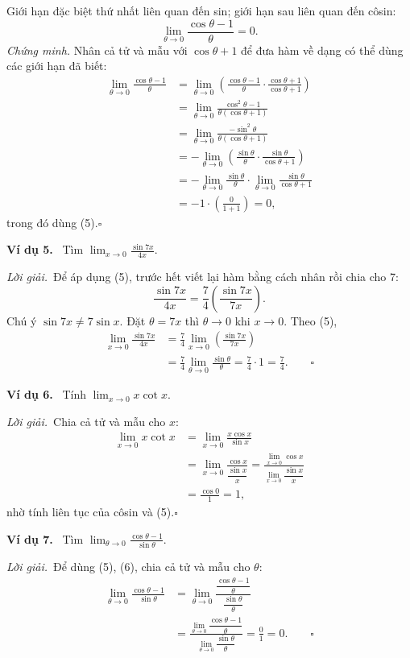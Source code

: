\documentclass[12pt,a4paper]{article}
\newcommand{\ex}[1]{\par\medskip\noindent\textbf{Ví dụ #1.}\ }
\newcommand{\sol}{\par\nopagebreak[4]\noindent\textit{Lời giải.}\ }
\begin{document}
Giới hạn đặc biệt thứ nhất liên quan đến sin; giới hạn sau liên quan đến côsin:
\[\lim_{\theta\to0}\frac{\cos\theta-1}{\theta}=0.\tag{6}\]
\noindent\textit{Chứng minh.} Nhân cả tử và mẫu với $\cos\theta+1$ để đưa hàm về dạng có thể dùng các giới hạn đã biết:
\begin{align*}
\lim_{\theta\to0}\frac{\cos\theta-1}{\theta}
&=\lim_{\theta\to0}\left(\frac{\cos\theta-1}{\theta}\cdot\frac{\cos\theta+1}{\cos\theta+1}\right)\\
&=\lim_{\theta\to0}\frac{\cos^2\theta-1}{\theta(\cos\theta+1)}\\
&=\lim_{\theta\to0}\frac{-\sin^2\theta}{\theta(\cos\theta+1)}\\
&=-\lim_{\theta\to0}\left(\frac{\sin\theta}{\theta}\cdot\frac{\sin\theta}{\cos\theta+1}\right)\\
&=-\lim_{\theta\to0}\frac{\sin\theta}{\theta}\cdot\lim_{\theta\to0}\frac{\sin\theta}{\cos\theta+1}\\
&=-1\cdot\left(\frac0{1+1}\right)=0,
\end{align*}
trong đó dùng (5).\hfill$\square$
\ex{5} Tìm $\displaystyle\lim_{x\to0}\frac{\sin7x}{4x}$.
\sol Để áp dụng (5), trước hết viết lại hàm bằng cách nhân rồi chia cho 7:
\[\frac{\sin7x}{4x}=\frac74\left(\frac{\sin7x}{7x}\right).\]
Chú ý $\sin7x\ne7\sin x$. Đặt $\theta=7x$ thì $\theta\to0$ khi $x\to0$. Theo (5),
\begin{align*}
\lim_{x\to0}\frac{\sin7x}{4x}&=\frac74\lim_{x\to0}\left(\frac{\sin7x}{7x}\right)\\
&=\frac74\lim_{\theta\to0}\frac{\sin\theta}{\theta}=\frac74\cdot1=\frac74.\qquad\square
\end{align*}
\ex{6} Tính $\displaystyle\lim_{x\to0}x\cot x$.
\sol Chia cả tử và mẫu cho $x$:
\begin{align*}
\lim_{x\to0}x\cot x&=\lim_{x\to0}\frac{x\cos x}{\sin x}\\
&=\lim_{x\to0}\frac{\cos x}{\dfrac{\sin x}x}
=\frac{\displaystyle\lim_{x\to0}\cos x}{\displaystyle\lim_{x\to0}\dfrac{\sin x}x}\\
&=\frac{\cos0}1=1,
\end{align*}
nhờ tính liên tục của côsin và (5).\hfill$\square$
\ex{7} Tìm $\displaystyle\lim_{\theta\to0}\frac{\cos\theta-1}{\sin\theta}$.
\sol Để dùng (5), (6), chia cả tử và mẫu cho $\theta$:
\begin{align*}
\lim_{\theta\to0}\frac{\cos\theta-1}{\sin\theta}
&=\lim_{\theta\to0}\frac{\dfrac{\cos\theta-1}{\theta}}{\dfrac{\sin\theta}{\theta}}\\
&=\frac{\displaystyle\lim_{\theta\to0}\dfrac{\cos\theta-1}{\theta}}{\displaystyle\lim_{\theta\to0}\dfrac{\sin\theta}{\theta}}=\frac01=0.\qquad\square
\end{align*}
\end{document}
